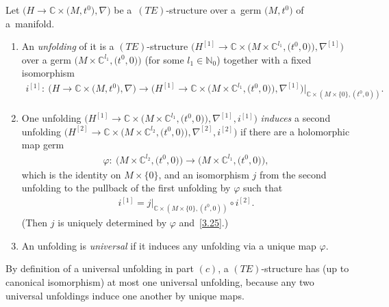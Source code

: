 \documentclass[10pt,a4paper]{amsart}
\numberwithin{equation}{section}
\numberwithin{figure}{section}
\newcommand{\N}{{\mathbb N}}
\newcommand{\C}{{\mathbb C}}
\newcommand{\nnn}{\nabla}
\begin{document}
\begin{Definition}\label{t3.15}
Let $\big(H\to\C\times \big(M,t^0\big),\nnn\big)$ be a~$(TE)$-structure over a~germ $\big(M,t^0\big)$ of a~mani\-fold.
\begin{enumerate}\itemsep=0pt
\item[$(a)$] An {\it unfolding} of it is a $(TE)$-structure
$\big(H^{[1]}\to\C\times \big(M\times \C^{l_1},\big(t^0,0\big)\big),\nnn^{[1]}\big)$
over a germ $\big(M\times \C^{l_1},\big(t^0,0\big)\big)$
(for some $l_1\in\N_0$)
together with a fixed isomorphism
\begin{gather*}%
i^{[1]}\colon \ \big(H\to\C\times \big(M,t^0\big),\!\nnn\big)
\to \big(H^{[1]}\to\C\times \big(M\times \C^{l_1},\big(t^0,0\big)\big),
\!\nnn^{[1]}\big)|_{\C\times (M\times\{0\},(t^0,0))} .
\end{gather*}

\item[$(b)$] One unfolding $\big(H^{[1]}\to\C\times\big(M\times \C^{l_1},
\big(t^0,0\big)\big),\nnn^{[1]},i^{[1]}\big)$ {\it induces}
a second unfolding $\big(H^{[2]}\to\C\times\big(M\times \C^{l_2},
\big(t^0,0\big)\big),\nnn^{[2]},i^{[2]}\big)$ if there
are a holomorphic map germ
\begin{gather*}%
\varphi\colon\ \big(M\times \C^{l_2},\big(t^0,0\big)\big)\to \big(M\times \C^{l_1},\big(t^0,0\big)\big),
\end{gather*}
which is the identity on $M\times \{0\}$,
and an isomorphism $j$ from the second unfolding to the
pullback of the first unfolding by $\varphi$ such that
\begin{gather}\label{3.25}
i^{[1]}= j|_{\C\times (M\times \{0\},(t^0,0))}\circ i^{[2]}.
\end{gather}
(Then $j$ is uniquely determined by $\varphi$ and~\eqref{3.25}.)

\item[$(c)$] An unfolding is {\it universal} if it induces any unfolding
via a unique map $\varphi$.
\end{enumerate}
\end{Definition}

By definition of a universal unfolding in part $(c)$,
a $(TE)$-structure has (up to canonical isomorphism)
at most one universal unfolding, because any two universal
unfoldings induce one another by unique maps.
\end{document}

